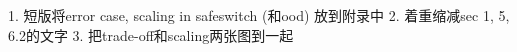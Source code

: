 1. 短版将error case, scaling in safeswitch (和ood) 放到附录中
2. 着重缩减sec 1, 5, 6.2的文字
3. 把trade-off和scaling两张图到一起